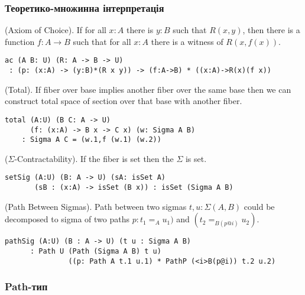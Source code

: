 \subsubsection{Теоретико-множинна інтерпретація}

\begin{theorem} (Axiom of Choice).
If for all $x : A$ there is $y : B$ such that $R(x,y)$,
then there is a function $f : A \rightarrow B$
such that for all $x : A$ there is a witness of $R(x,f(x))$.
\begin{lstlisting}
ac (A B: U) (R: A -> B -> U)
 : (p: (x:A) -> (y:B)*(R x y)) -> (f:A->B) * ((x:A)->R(x)(f x))
\end{lstlisting}
\end{theorem}

\begin{theorem} (Total).
If fiber over base implies another fiber
over the same base then we can construct total space of section
over that base with another fiber.
\begin{lstlisting}
total (A:U) (B C: A -> U)
      (f: (x:A) -> B x -> C x) (w: Sigma A B)
    : Sigma A C = (w.1,f (w.1) (w.2))
\end{lstlisting}
\end{theorem}

\begin{theorem} ($\Sigma$-Contractability). If the fiber is set then the $\Sigma$ is set.
\begin{lstlisting}
setSig (A:U) (B: A -> U) (sA: isSet A)
       (sB : (x:A) -> isSet (B x)) : isSet (Sigma A B)
\end{lstlisting}
\end{theorem}

\begin{theorem} (Path Between Sigmas).
Path between two sigmas $t,u: \Sigma(A,B)$ could be decomposed to
sigma of two paths $p:t_1=_{A}u_1)$ and $(t_2=_{B(p@i)}u_2)$.
\begin{lstlisting}
pathSig (A:U) (B : A -> U) (t u : Sigma A B)
      : Path U (Path (Sigma A B) t u)
               ((p: Path A t.1 u.1) * PathP (<i>B(p@i)) t.2 u.2)
\end{lstlisting}
\end{theorem}

\subsubsection{Path-тип}

